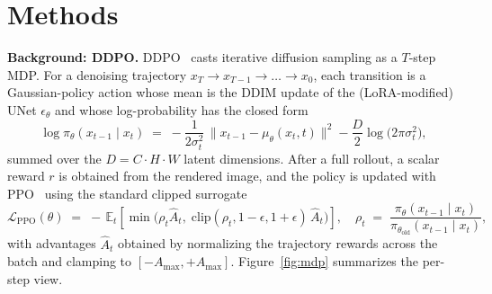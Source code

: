 \documentclass[10pt,letterpaper]{article}
\newcommand{\paragraphhead}[1]{\vspace{0.4ex}\noindent\textbf{#1}\hspace{0.5em}}
\begin{document}
\section{Methods}
\label{sec:methods}

\paragraphhead{Background: DDPO.}
DDPO~\citep{Black23} casts iterative diffusion sampling as a $T$-step MDP. For a denoising trajectory $x_T \to x_{T-1} \to \dots \to x_0$, each transition is a Gaussian-policy action whose mean is the DDIM update of the (LoRA-modified) UNet $\epsilon_\theta$ and whose log-probability has the closed form
\begin{equation*}
  \log \pi_\theta(x_{t-1} \mid x_t) \;=\; -\frac{1}{2\sigma_t^2}\,\lVert x_{t-1} - \mu_\theta(x_t, t)\rVert^2 - \frac{D}{2}\log\!\bigl(2\pi\sigma_t^2\bigr),
\end{equation*}
summed over the $D = C \cdot H \cdot W$ latent dimensions. After a full rollout, a scalar reward $r$ is obtained from the rendered image, and the policy is updated with PPO~\citep{Schulman17} using the standard clipped surrogate
\begin{equation}
  \mathcal{L}_{\text{PPO}}(\theta) \;=\; -\,\mathbb{E}_t\!\left[\min\!\bigl(\rho_t \hat A_t,\; \mathrm{clip}(\rho_t, 1-\epsilon, 1+\epsilon)\,\hat A_t\bigr)\right],
  \quad \rho_t \;=\; \frac{\pi_\theta(x_{t-1}\mid x_t)}{\pi_{\theta_{\text{old}}}(x_{t-1}\mid x_t)},
  \label{eq:ppo}
\end{equation}
with advantages $\hat A_t$ obtained by normalizing the trajectory rewards across the batch and clamping to $[-A_{\max}, +A_{\max}]$. Figure~\ref{fig:mdp} summarizes the per-step view.
\end{document}
